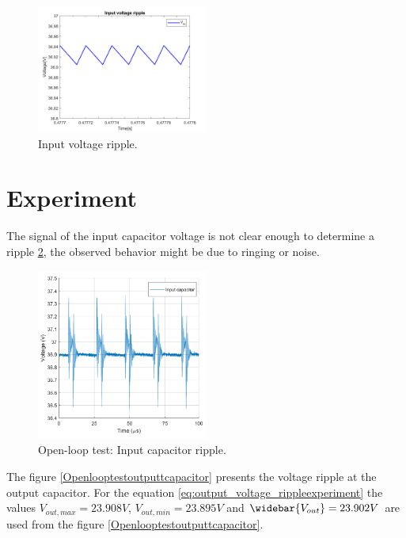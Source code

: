 \begin{figure}[H]
	\begin{center}
		\includegraphics[width=0.5\textwidth]{../Pictures/P1/Open_loop_simulation/open_loop_Vin_ripple.png}
		\caption{Input voltage ripple.}
		\label{fig:input_voltage_ripple}
	\end{center}	
\end{figure}

\section{Experiment}

The signal of the input capacitor voltage is not clear enough to determine a ripple \ref{Openlooptestinputcapacitor}, the observed behavior might be due to ringing or noise.

\begin{figure}[H]
	\begin{center}
		\includegraphics[width=0.5\textwidth]{../Pictures/P1/Test/Openloopinputcapacitor}
		\caption{Open-loop test: Input capacitor ripple.}
		\label{Openlooptestinputcapacitor}
	\end{center}	
\end{figure}

The figure \ref{Openlooptestoutputtcapacitor} presents the voltage ripple at the output capacitor. For the equation \ref{eq:output_voltage_rippleexperiment} the values $V_{out,max} = 23.908V$, $V_{out,min} = 23.895V$ and $\widebar{V_{out}} = 23.902V$ are used from the figure  \ref{Openlooptestoutputtcapacitor}.

